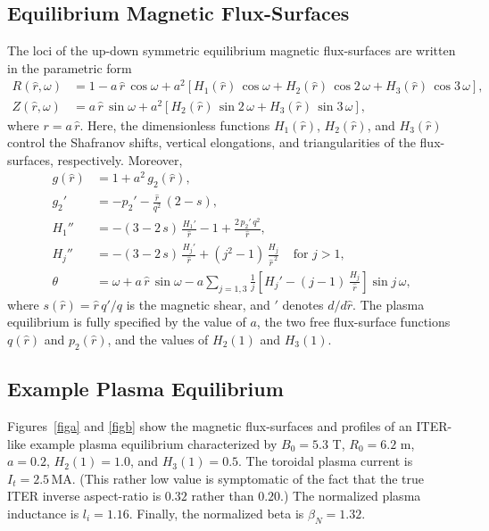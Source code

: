 \documentclass[12pt,prb,aps]{revtex4-1}
\begin{document}
\subsection{Equilibrium Magnetic Flux-Surfaces}
The loci of the up-down symmetric equilibrium magnetic flux-surfaces are written in the parametric form\,\cite{tear5}
\begin{align}
R(\hat{r},\omega) &= 1 -a\,\hat{r}\,\cos\omega + a^{2}\left[H_1(\hat{r})\,\cos \omega + H_2(\hat{r})\,\cos 2\,\omega+H_3(\hat{r})\,\cos 3\,\omega\right], \label{e19x}\\[0.5ex]
Z(\hat{r},\omega)&= a\,\hat{r}\,\sin\omega +a^{2}\left[H_2(\hat{r})\,\sin 2\,\omega+H_3(\hat{r})\,\sin 3\,\omega\right], \label{e20x}
\end{align}
where  $r=a\,\hat{r}$. 
Here, the dimensionless functions $H_1(\hat{r})$, $H_2(\hat{r})$, and $H_3(\hat{r})$ control the Shafranov shifts, vertical elongations, and  triangularities of
the flux-surfaces, respectively. 
Moreover,\cite{exp}
\begin{align}
g(\hat{r}) &= 1+ a^2\,g_2(\hat{r}),\\[0.5ex]
g_2'&= -p_2' - \frac{\hat{r}}{q^2}\,(2-s),\\[0.5ex]
H_1''&= -(3-2\,s)\,\frac{H_1' }{\hat{r}}-1+\frac{2\,p_2'\,q^2}{\hat{r}},\label{e27}\\[0.5ex]
H_j''&= -(3-2\,s)\,\frac{H_j'}{\hat{r}}+(j^2-1)\,\frac{H_j}{\hat{r}^{\,2}}~~~~~\mbox{for $j>1$},\label{e33x}\\[0.5ex]
\theta &= \omega+a\,\hat{r}\,\sin\omega - a\sum_{j=1,3}\frac{1}{j}\left[H_j'-(j-1)\,\frac{H_j}{\hat{r}}\right]\sin j\,\omega,
\end{align}
where $s(\hat{r}) = \hat{r}\,q'/q$ is the magnetic shear, and $'$ denotes $d/d\hat{r}$. The plasma equilibrium is fully specified by the value of $a$, the two free
flux-surface functions $q(\hat{r})$ and $p_2(\hat{r})$, and the values of $H_2(1)$ and $H_3(1)$. 

\subsection{Example Plasma Equilibrium}
Figures~\ref{figa} and \ref{figb} show the magnetic flux-surfaces and profiles of an ITER-like  example plasma equilibrium characterized by 
$B_0=5.3$ T, $R_0=6.2$ m, $a=0.2$, $H_2(1)=1.0$, and $H_3(1)= 0.5$. The toroidal plasma current is $I_t=2.5$\,MA. (This rather low value
is symptomatic of the fact that the true ITER inverse aspect-ratio is  $0.32$ rather than $0.20$.) The normalized plasma inductance is
$l_i=1.16$. Finally, the normalized beta is $\beta_N= 1.32$. 
\end{document}
